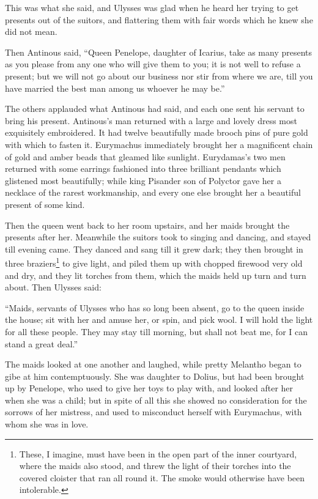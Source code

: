This was what she said, and Ulysses was glad when he heard her trying to get
presents out of the suitors, and flattering them with fair words which he knew
she did not mean.

Then Antinous said, “Queen Penelope, daughter of Icarius, take as many presents
as you please from any one who will give them to you; it is not well to refuse
a present; but we will not go about our business nor stir from where we are,
till you have married the best man among us whoever he may be.”

The others applauded what Antinous had said, and each one sent his servant to
bring his present. Antinous’s man returned with a large and lovely dress most
exquisitely embroidered. It had twelve beautifully made brooch pins of pure
gold with which to fasten it. Eurymachus immediately brought her a magnificent
chain of gold and amber beads that gleamed like sunlight. Eurydamas’s two men
returned with some earrings fashioned into three brilliant pendants which
glistened most beautifully; while king Pisander son of Polyctor gave her a
necklace of the rarest workmanship, and every one else brought her a beautiful
present of some kind.

Then the queen went back to her room upstairs, and her maids brought the
presents after her. Meanwhile the suitors took to singing and dancing, and
stayed till evening came. They danced and sang till it grew dark; they then
brought in three braziers\footnote{These, I imagine, must have been in the open part of the inner courtyard,
where the maids also stood, and threw the light of their torches into the
covered cloister that ran all round it. The smoke would otherwise have been
intolerable.} to give light, and piled them up
with chopped firewood very old and dry, and they lit torches from them, which
the maids held up turn and turn about. Then Ulysses said:

“Maids, servants of Ulysses who has so long been absent, go to the queen inside
the house; sit with her and amuse her, or spin, and pick wool. I will hold the
light for all these people. They may stay till morning, but shall not beat me,
for I can stand a great deal.”

The maids looked at one another and laughed, while pretty Melantho began to
gibe at him contemptuously. She was daughter to Dolius, but had been brought up
by Penelope, who used to give her toys to play with, and looked after her when
she was a child; but in spite of all this she showed no consideration for the
sorrows of her mistress, and used to misconduct herself with Eurymachus, with
whom she was in love.

